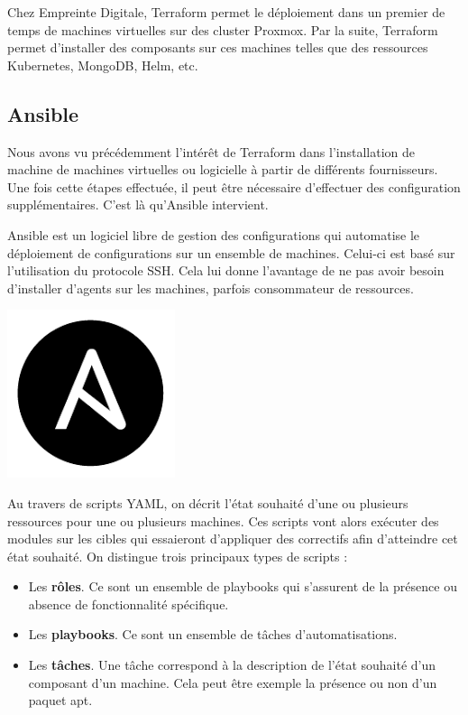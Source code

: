 \documentclass[12pt]{article}
\begin{document}
Chez Empreinte Digitale, Terraform permet le déploiement dans un premier de temps de machines virtuelles sur des cluster Proxmox. 
Par la suite, Terraform permet d'installer des composants sur ces machines telles que des ressources Kubernetes, MongoDB, Helm, etc.

\newpage
\subsection{Ansible}
Nous avons vu précédemment l'intérêt de Terraform dans l'installation de machine de machines virtuelles ou logicielle à partir de différents fournisseurs. 
Une fois cette étapes effectuée, il peut être nécessaire d'effectuer des configuration supplémentaires. 
C'est là qu'Ansible intervient.

\noindent%
\begin{minipage}{.8\textwidth}%
Ansible est un logiciel libre de gestion des configurations qui automatise le déploiement de configurations sur un ensemble de machines. 
Celui-ci est basé sur l'utilisation du protocole SSH. 
Cela lui donne l'avantage de ne pas avoir besoin d'installer d'agents sur les machines, parfois consommateur de ressources.

\end{minipage}%
\hfill
\begin{minipage}{.2\textwidth}%
\begin{center}
\includegraphics[scale=0.3]{src/logo_ansible.png}
\end{center}
\end{minipage}%

Au travers de scripts YAML, on décrit l'état souhaité d'une ou plusieurs ressources pour une ou plusieurs machines. 
Ces scripts vont alors exécuter des modules sur les cibles qui essaieront d'appliquer des correctifs afin d'atteindre cet état souhaité. 
On distingue trois principaux types de scripts :
\begin{itemize}
    \item Les \textbf{rôles}. Ce sont un ensemble de playbooks qui s'assurent de la présence ou absence de fonctionnalité spécifique.
    \item Les \textbf{playbooks}. Ce sont un ensemble de tâches d'automatisations.
    \item Les \textbf{tâches}. Une tâche correspond à la description de l'état souhaité d'un composant d'un machine. 
    Cela peut être exemple la présence ou non d'un paquet apt.
\end{itemize}
\end{document}
